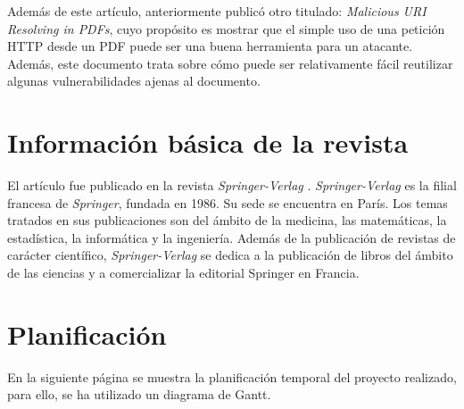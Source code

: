 \documentclass[a4paper,11pt]{report}
\begin{document}
Además de este artículo, anteriormente publicó otro titulado: \emph{Malicious URI Resolving in PDFs}, cuyo propósito es mostrar que el simple uso de una petición HTTP desde un PDF puede ser una buena herramienta  para un atacante. Además, este documento trata sobre cómo puede ser relativamente fácil reutilizar algunas vulnerabilidades ajenas al documento. 

\section{Información básica de la revista}\label{revista}

El artículo fue publicado en la revista \emph{Springer-Verlag} \cite{Springer-Verlag}. \emph{Springer-Verlag} es la filial francesa de \emph{Springer}, fundada en 1986. Su sede se encuentra en París. Los temas tratados en sus publicaciones son del ámbito de la medicina, las matemáticas, la estadística, la informática y la ingeniería. Además de la publicación de revistas de carácter científico, \emph{Springer-Verlag} se dedica a la publicación de libros del ámbito de las ciencias y a comercializar la editorial Springer en Francia. 


\section{Planificación} \label{planificacion}

En la siguiente página se muestra la planificación temporal del proyecto realizado, para ello, se ha utilizado un diagrama de Gantt.
\end{document}
